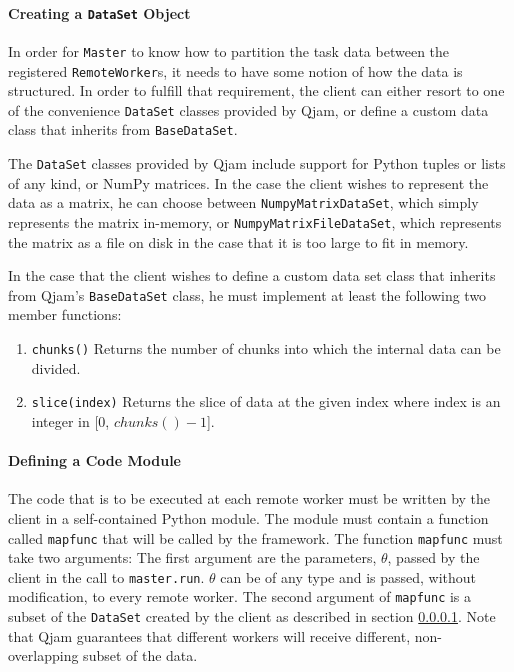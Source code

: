 \documentclass[%
  final,
  notitlepage,
  narroweqnarray,
  inline,
]{ieee}
\begin{document}
\paragraph{Creating a \texttt{DataSet} Object}
\label{DataSets}

In order for \texttt{Master} to know how to partition the task data between the
registered \texttt{RemoteWorker}s, it needs to have some notion of how the data
is structured. In order to fulfill that requirement, the client can either
resort to one of the convenience \texttt{DataSet} classes provided by Qjam, or
define a custom data class that inherits from \texttt{BaseDataSet}.

The \texttt{DataSet} classes provided by Qjam include support for Python tuples
or lists of any kind, or NumPy matrices. In the case the client wishes to
represent the data as a matrix, he can choose between
\texttt{NumpyMatrixDataSet}, which simply represents the matrix in-memory, or
\texttt{NumpyMatrixFileDataSet}, which represents the matrix as a file on disk
in the case that it is too large to fit in memory.

In the case that the client wishes to define a custom data set class that
inherits from Qjam's \texttt{BaseDataSet} class, he must implement at least
the following two member functions:
\begin{enumerate}
  \item
    \texttt{chunks()}
    Returns the number of chunks into which the internal data can be divided.
  \item
    \texttt{slice(index)}
    Returns the slice of data at the given index where index is an integer
    in [0, $chunks() - 1$].
\end{enumerate}


\paragraph{Defining a Code Module}

The code that is to be executed at each remote worker must be written by the
client in a self-contained Python module. The module must contain a function
called \texttt{mapfunc} that will be called by the framework. The function
\texttt{mapfunc} must take two arguments: The first argument are the parameters,
$\theta$, passed by the client in the call to \texttt{master.run}. $\theta$ can
be of any type and is passed, without modification, to every remote worker. The
second argument of \texttt{mapfunc} is a subset of the \texttt{DataSet} created
by the client as described in section \ref{DataSets}. Note that Qjam guarantees
that different workers will receive different, non-overlapping subset of the
data.
\end{document}
